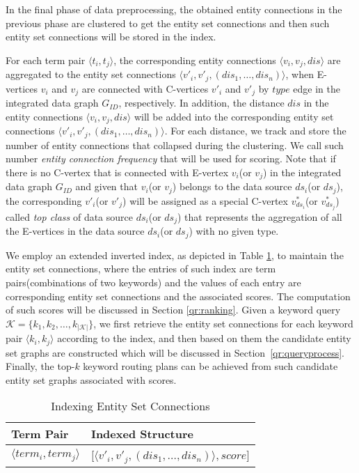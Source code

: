 In the final phase of data preprocessing, the obtained entity connections in the previous phase are
clustered to get the entity set connections and then such entity set connections will be stored in
the index.

For each term pair $\langle t_i,t_j \rangle$, the corresponding entity connections $\langle
v_i,v_j,dis \rangle$ are aggregated to the entity set connections $\langle
v'_i,v'_j,(dis_1,\ldots,dis_n) \rangle$, when E-vertices $v_i$ and $v_j$ are connected with
C-vertices $v'_i$ and $v'_j$ by $type$ edge in the integrated data graph $G_{ID}$, respectively. In
addition, the distance $dis$ in the entity connections $\langle v_i,v_j,dis \rangle$ will be added
into the corresponding entity set connections $\langle v'_i,v'_j,(dis_1,\ldots,dis_n) \rangle$. For
each distance, we track and store the number of entity connections that collapsed during the
clustering. We call such number \emph{entity connection frequency} that will be used for scoring.
Note that if there is no C-vertex that is connected with E-vertex $v_i$(or $v_j$) in the integrated
data graph $G_{ID}$ and given that $v_i$(or $v_j$) belongs to the data source $ds_i$(or $ds_j$), the
corresponding $v'_i$(or $v'_j$) will be assigned as a special C-vertex $v^*_{ds_i}$(or $v^*_{ds_j}$)
called \emph{top class} of data source $ds_i$(or $ds_j$)  that represents the aggregation of all the
E-vertices in the data source $ds_i$(or $ds_j$) with no given type.

We employ an extended inverted index, as depicted in Table \ref{index}, to maintain the entity set
connections, where the entries of such index are term pairs(combinations of two keywords) and the
values of each entry are corresponding entity set connections and the associated scores. The
computation of such scores will be discussed in Section \ref{qr:ranking}. Given a keyword query
$\mathcal{K} = \{k_1,k_2,\ldots,k_{\left\vert\mathcal{K}\right\vert}\}$, we first retrieve the entity
set connections for each keyword pair $\langle k_i,k_j \rangle$ according to the index, and then
based on them the candidate entity set graphs are constructed which will be discussed in
Section~\ref{qr:queryprocess}. Finally, the top-$k$ keyword routing plans can be achieved from such
candidate entity set graphs associated with scores.

{\tiny
\begin{table}[tbp]
\centering
\begin{tabular}{|l||l|}
\hline
\textbf{Term Pair} & \textbf{Indexed Structure} \\
\hline
\hline
$\langle term_i,term_j \rangle$  & [$\langle v'_i,v'_j,(dis_1,\ldots,dis_n) \rangle,score$] \\
\hline
\end{tabular}
\caption{Indexing Entity Set Connections} \label{index}
\end{table}
}

